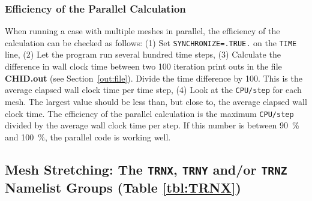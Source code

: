 \documentclass[11pt]{book}
\newcommand{\ct}{\tt\small}
\begin{document}
\subsubsection{Efficiency of the Parallel Calculation}

When running a case with multiple meshes in parallel, the efficiency of the
calculation can be checked as follows: (1) Set {\ct SYNCHRONIZE=.TRUE.} on the
{\ct TIME} line, (2) Let the program run several hundred time steps, (3) Calculate
the difference in wall clock time between two 100 iteration print outs in
the file {\bf CHID.out} (see Section~\ref{out:file}).
Divide the time difference by 100. This is the average
elapsed wall clock time per time step, (4) Look at the {\ct CPU/step} for each mesh. The
largest value should be less than, but close to, the average elapsed wall clock time.
The efficiency of the parallel calculation is the maximum {\ct CPU/step} divided by
the average wall clock time per step. If this number is between 90~\% and 100~\%, the
parallel code is working well.



\subsection{Mesh Stretching: The \texorpdfstring{{\tt TRNX}}{TRNX}, \texorpdfstring{{\tt TRNY}}{TRNY} and/or \texorpdfstring{{\tt TRNZ}}{TRNZ} Namelist Groups (Table \ref{tbl:TRNX})}
\label{info:TRNX}
\end{document}
